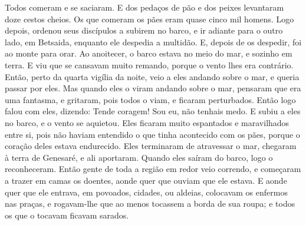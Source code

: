 {  Todos comeram e se saciaram.
  E dos pedaços de pão e dos peixes levantaram doze cestos cheios.
  Os que comeram os pães eram quase cinco mil homens.
  Logo depois, ordenou seus discípulos a subirem no barco, e ir adiante para o outro lado, em Betsaida, enquanto ele despedia a multidão.
  E, depois de os despedir, foi ao monte para orar.
  Ao anoitecer, o barco estava no meio do mar, e
{} sozinho em terra.
  E viu que se cansavam muito remando, porque o vento lhes era contrário. Então, perto da quarta vigília da noite, veio a eles andando sobre o mar, e queria passar por eles.
  Mas quando eles o viram andando sobre o mar, pensaram que era uma fantasma, e gritaram,
  pois todos o viam, e ficaram perturbados. Então logo falou com eles, dizendo: Tende coragem! Sou eu, não tenhais medo.
  E subiu a eles no barco, e o vento se aquietou. Eles ficaram muito espantados e maravilhados entre si,
  pois não haviam entendido o que tinha acontecido com os pães, porque o coração deles estava endurecido.
  Eles terminaram de atravessar o mar, chegaram à terra de Genesaré, e ali aportaram.
  Quando eles saíram do barco, logo
{} o reconheceram.
  Então gente de toda a região em redor veio correndo, e começaram a trazer em camas os doentes, aonde quer que ouviam que ele estava.
  E aonde quer que ele entrava, em povoados, cidades, ou aldeias, colocavam os enfermos nas praças, e rogavam-lhe que ao menos tocassem a borda de sua roupa; e todos os que o tocavam ficavam sarados.
\par }

